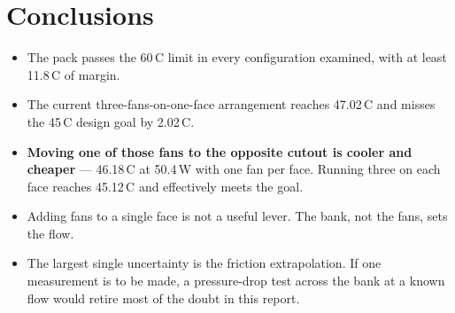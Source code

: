 \documentclass[11pt,a4paper]{article}
\newcommand{\qty}[2]{#1\,#2}
\begin{document}
\section{Conclusions}

\begin{itemize}
\item The pack passes the \qty{60}{\textdegree C} limit in every configuration
examined, with at least \qty{11.8}{\textdegree C} of margin.
\item The current three-fans-on-one-face arrangement reaches
\qty{47.02}{\textdegree C} and misses the \qty{45}{\textdegree C} design goal by
\qty{2.02}{\textdegree C}.
\item \textbf{Moving one of those fans to the opposite cutout is cooler and
cheaper} --- \qty{46.18}{\textdegree C} at \qty{50.4}{W} with one fan per face.
Running three on each face reaches \qty{45.12}{\textdegree C} and effectively meets
the goal.
\item Adding fans to a single face is not a useful lever. The bank, not the
fans, sets the flow.
\item The largest single uncertainty is the friction extrapolation. If one
measurement is to be made, a pressure-drop test across the bank at a known flow
would retire most of the doubt in this report.
\end{itemize}
\end{document}
